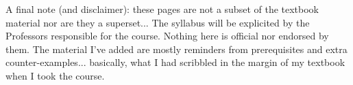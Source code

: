 A final note (and disclaimer): these pages are not a subset of the textbook material nor are they a superset... The syllabus will be explicited by the Professors responsible for the course. Nothing here is official nor endorsed by them. The material I've added are mostly reminders from prerequisites and extra counter-examples... basically, what I had scribbled in the margin of my textbook when I took the course.
